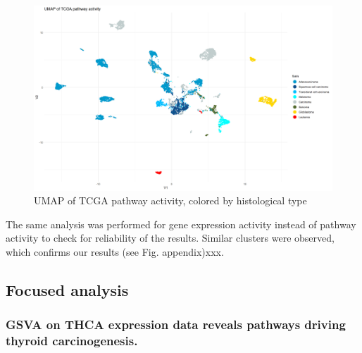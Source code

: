 \documentclass[
]{article}
\begin{document}
\begin{figure}

{\centering \includegraphics[width=0.8\linewidth]{figures/Pan Cancer UMAP cancer form} 

}

\caption{UMAP of TCGA pathway activity, colored by histological type}\label{fig:UMAPPanForm}
\end{figure}

The same analysis was performed for gene expression activity instead of
pathway activity to check for reliability of the results. Similar
clusters were observed, which confirms our results (see Fig.
appendix)xxx.

\hypertarget{focused-analysis}{%
\subsection{Focused analysis}\label{focused-analysis}}

\hypertarget{gsva-on-thca-expression-data-reveals-pathways-driving-thyroid-carcinogenesis.}{%
\subsubsection{GSVA on THCA expression data reveals pathways driving
thyroid
carcinogenesis.}\label{gsva-on-thca-expression-data-reveals-pathways-driving-thyroid-carcinogenesis.}}
\end{document}

